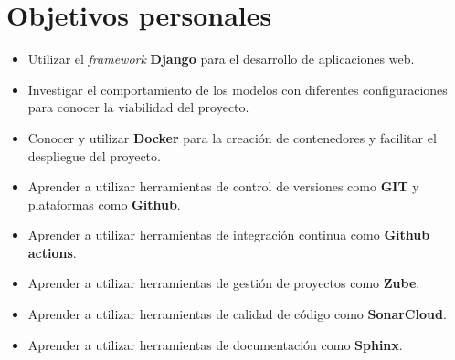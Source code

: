 \section{Objetivos personales}\label{objetivos_personasles}
\begin{itemize}
    \item Utilizar el \textit{framework} \textbf{Django} para el desarrollo de aplicaciones web.
    \item Investigar el comportamiento de los modelos con diferentes configuraciones para conocer la viabilidad del proyecto.
    \item Conocer y utilizar \textbf{Docker} para la creación de contenedores y facilitar el despliegue del proyecto.
    \item Aprender a utilizar herramientas de control de versiones como \textbf{GIT} y plataformas como \textbf{Github}.
    \item Aprender a utilizar herramientas de integración continua como \textbf{Github actions}.
    \item Aprender a utilizar herramientas de gestión de proyectos como \textbf{Zube}.
    \item Aprender a utilizar herramientas de calidad de código como \textbf{SonarCloud}.
    \item Aprender a utilizar herramientas de documentación como \textbf{Sphinx}.
\end{itemize}